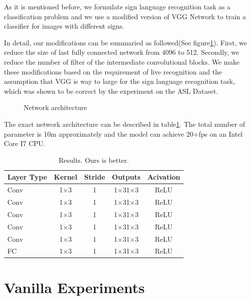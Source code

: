 \documentclass[10pt,twocolumn,letterpaper]{article}
\begin{document}
As it is mentioned before, we formulate sign language recognition task as a classification problem and we use a modified version of VGG Network \cite{simonyan2014very} to train a classifier for images with different signs. 

In detail, our modifications can be summaried as followed(See figure\ref{fig:arch}). First, we reduce the size of last fully connected network from 4096 to 512. Secondly, we reduce the number of filter of the intermediate convolutional blocks. We make these modifications based on the requirement of live recognition and the assumption that VGG is way to large for the sign language recognition task, which was shown to be correct by the experiment on the ASL Dataset.

\begin{figure}[ht]
\begin{center}
\fbox{\rule{0pt}{2in} \rule{.9\linewidth}{0pt}}
\end{center}
   \caption{Network architecture}
\label{fig:arch}
\end{figure}

The exact network architecture can be described in table\ref{table:arch}. The total number of parameter is 10m approximately and the model can achieve 20+fps on an Intel Core I7 CPU.  

\begin{table}[h]
\begin{center}
\begin{tabular}{|l|c|c|c|c|}
\hline
Layer Type & Kernel & Stride & Outputs & Acivation \\
\hline\hline
Conv & 1$\times$3 & 1 & 1$\times$31$\times$3 & ReLU\\
Conv & 1$\times$3 & 1 & 1$\times$31$\times$3 & ReLU\\
Conv & 1$\times$3 & 1 & 1$\times$31$\times$3 & ReLU\\
Conv & 1$\times$3 & 1 & 1$\times$31$\times$3 & ReLU\\
Conv & 1$\times$3 & 1 & 1$\times$31$\times$3 & ReLU\\
FC & 1$\times$3 & 1 & 1$\times$31$\times$3 & ReLU\\
\hline
\end{tabular}
\end{center}
\caption{Results.  Ours is better.}
\label{table:arch}
\end{table}



\section{Vanilla Experiments}
\end{document}
